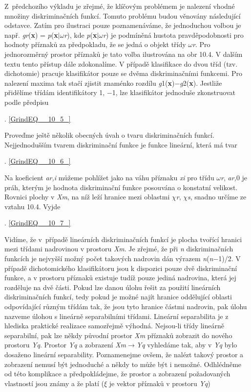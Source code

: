\noindent 

\noindent Z~předchozího výkladu je zřejmé, že klíčovým problémem je nalezení vhodné množiny diskriminačních funkcí. Tomuto problému budou věnovány následující odstavce. Zatím pro ilustraci pouze poznamenáváme, že jednoduchou volbou je např. \textit{gr}(\textbf{x}) = \textit{p}(\textbf{x}$\mid$$\omega$\textit{r}), kde \textit{p}(\textbf{x}$\mid$$\omega$\textit{r}) je podmíněná hustota pravděpodobnosti pro hodnoty příznaků za předpokladu, že se jedná o objekt třídy $\omega$\textit{r}. Pro jednorozměrný prostor příznaků je tato volba ilustrována na obr 10.4. V dalším textu tento přístup dále zdokonalíme. V případě klasifikace do dvou tříd (tzv. dichotomie) pracuje klasifikátor pouze se dvěma diskriminačními funkcemi. Pro nalezení maxima tak stačí zjistit znaménko rozdílu  \textit{g}1(\textbf{x})$-$\textit{g}2(\textbf{x}). Jestliže přidělíme třídám identifikátory 1,    $-$1, lze klasifikátor jednoduše zkonstruovat podle předpisu 

 . \eqref{GrindEQ__10_5_}

\noindent Proveďme ještě několik obecných úvah o tvaru diskriminačních funkcí. Nejjednodušším tvarem diskriminační funkce je funkce lineární, která má tvar

 . \eqref{GrindEQ__10_6_}

\noindent Na koeficient \textit{ar,i} můžeme pohlížet jako na váhu příznaku \textit{xi} pro třídu $\omega$\textit{r}, \textit{ar,}0 je práh, kterým je hodnota diskriminační funkce posouvána o konstatní velikost. Rovnici plochy v \textit{Xm}, na níž leží hranice mezi oblastmi $\chi$\textit{r}, $\chi$\textit{s}, snadno určíme ze vztahu 10.4. Vyjde

 . \eqref{GrindEQ__10_7_}

\noindent Vidíme, že v~případě lineárních diskriminačních funkcí je plocha tvořící hranici mezi třídami nadrovinou v prostoru \textit{Xm}. Je zřejmé, že při \textit{n} diskriminačních funkcích je nejvyšší možný počet takových nadrovin dán výrazem \textit{n}(\textit{n}$-$1)/2. V případě dichotomického klasifikátoru jsou k dispozici pouze dvě diskriminační funkce, a v prostoru příznaků existuje tudíž pouze jediná nadrovina, která jej rozděluje na dvě části. Pokud lze danou úlohu řešit za použití lineárních diskriminačních funkcí, tedy pokud je možné najít hranice oddělující oblasti odpovídající různým třídám tak, že jsou tyto hranice částmi    nadrovin, pak úlohu nazveme úlohou s lineárně separabilními třídami. Lineární separabilita je z hlediska praktické realizace samozřejmě výhodná. Nejsou-li třídy lineárně separabilní, pak lze někdy původní prostor \textit{Xm} příznaků zobrazit do nového prostoru \textit{Yq}. Prostor \textit{Yq} a zobrazení \textit{Xm}$\rightarrow$\textit{Yq} vyhledáme tak, aby v \textit{Yq} bylo dosaženo lineární separability. Poznamenejme ovšem, že nalézt takový prostor a zobrazení nemusí být jednoduché a někdy to může být i nemožné. Odhlédněme od této komplikace a předpokládejme, že prostor a zobrazení požadovaných vlastností jsou známy a že platí (\textbf{$\xi$} je vektor příznaků v prostoru \textit{Yq}) 


